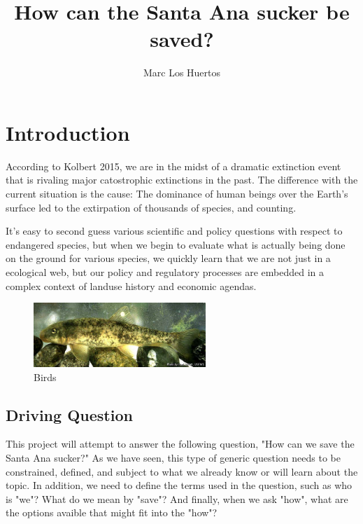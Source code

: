 \documentclass{article}\usepackage[]{graphicx}\usepackage[]{color}
\title{How can the Santa Ana sucker be saved?}
\author{Marc Los Huertos}
\begin{document}

\maketitle

\section{Introduction}

According to Kolbert 2015, we are in the midst of a dramatic extinction event that is rivaling major catostrophic extinctions in the past. The difference with the current situation is the cause: The dominance of human beings over the Earth's surface led to the extirpation of thousands of species, and counting. 

It's easy to second guess various scientific and policy questions with respect to endangered species, but when we begin to evaluate what is actually being done on the ground for various species, we quickly learn that we are not just in a ecological web, but our policy and regulatory processes are embedded in a complex context of landuse history and economic agendas.  

\begin{figure}
  \begin{center}
    \includegraphics[width=0.58\textwidth]{Catostomus_santaanae.jpg}
  \end{center}
  \caption{Birds}
\end{figure}


\subsection{Driving Question}

This project will attempt to answer the following question, "How can we save the Santa Ana sucker?" As we have seen, this type of generic question needs to be constrained, defined, and subject to what we already know or will learn about the topic. In addition, we need to define the terms used in the question, such as who is "we"? What do we mean by "save"?  And finally, when we ask "how", what are the options avaible that might fit into the "how"? 
\end{document}
